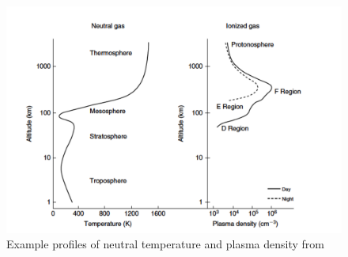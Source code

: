 \begin{figure}[!t]
\centering
\includegraphics[width=5in]{altvsparams}
\caption{Example profiles of neutral temperature and plasma density from \cite{kellybook}}
\label{fig:singlefilt}
\end{figure}

